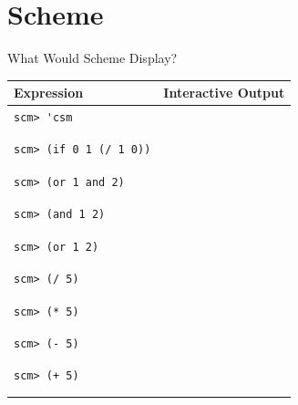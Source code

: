 \documentclass{exam}
\begin{document}

\section{Scheme}
\begin{questions}

\item What Would Scheme Display?
\begin{center}
    \begin{tabular}{|m{9cm}|m{6cm}|}
\hline
\textbf{Expression} & \textbf{Interactive Output} \\
\hline
\lstinline$scm> 'csm$ & \\ & \\ & \\
\hline
\lstinline$scm> (if 0 1 (/ 1 0))$ & \\ & \\ & \\
\hline
\lstinline$scm> (or 1 and 2)$ & \\ & \\ & \\
\hline
\lstinline$scm> (and 1 2)$ & \\ & \\ & \\
\hline
\lstinline$scm> (or 1 2)$ & \\ & \\ & \\
\hline
\lstinline$scm> (/ 5)$ & \\ & \\ & \\
\hline
\lstinline$scm> (* 5)$ & \\ & \\ & \\
\hline
\lstinline$scm> (- 5)$ & \\ & \\ & \\
\hline
\lstinline$scm> (+ 5)$ & \\ & \\ & \\
\hline
\end{tabular}
\end{center}


\end{questions}
\end{document}
